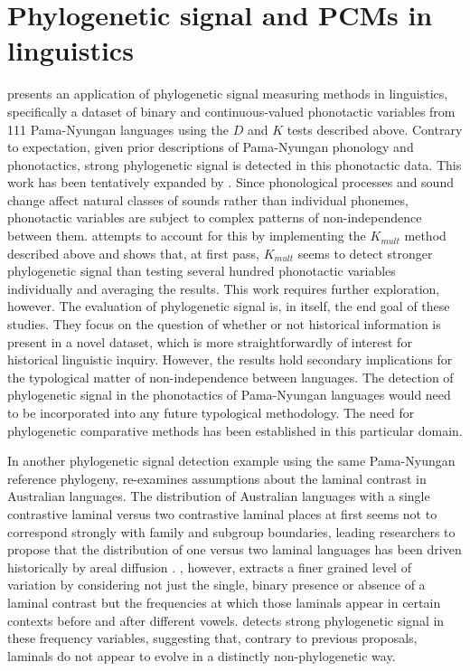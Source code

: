 \hypertarget{pcms-applications}{%
\section{Phylogenetic signal and PCMs in linguistics}\label{pcms-applications}}

\textcite{macklin-cordes_phylogenetic_2020} presents an application of phylogenetic signal measuring methods in linguistics, specifically a dataset of binary and continuous-valued phonotactic variables from 111 Pama-Nyungan languages using the \(D\) and \(K\) tests described above. Contrary to expectation, given prior descriptions of Pama-Nyungan phonology and phonotactics, strong phylogenetic signal is detected in this phonotactic data. This work has been tentatively expanded by \textcite{macklin-cordes_phylogeny_2018}. Since phonological processes and sound change affect natural classes of sounds rather than individual phonemes, phonotactic variables are subject to complex patterns of non-independence between them. \textcite{macklin-cordes_phylogeny_2018} attempts to account for this by implementing the \(K_{mult}\) method described above and shows that, at first pass, \(K_{mult}\) seems to detect stronger phylogenetic signal than testing several hundred phonotactic variables individually and averaging the results. This work requires further exploration, however. The evaluation of phylogenetic signal is, in itself, the end goal of these studies. They focus on the question of whether or not historical information is present in a novel dataset, which is more straightforwardly of interest for historical linguistic inquiry. However, the results hold secondary implications for the typological matter of non-independence between languages. The detection of phylogenetic signal in the phonotactics of Pama-Nyungan languages would need to be incorporated into any future typological methodology. The need for phylogenetic comparative methods has been established in this particular domain.

In another phylogenetic signal detection example using the same Pama-Nyungan reference phylogeny, \textcite{round_continent-wide_2017} re-examines assumptions about the laminal contrast in Australian languages. The distribution of Australian languages with a single contrastive laminal versus two contrastive laminal places at first seems not to correspond strongly with family and subgroup boundaries, leading researchers to propose that the distribution of one versus two laminal languages has been driven historically by areal diffusion \autocites{dixon_languages_1970}{dixon_languages_1980}{breen_taps_1997}{dixon_australian_2002}. \textcite{round_continent-wide_2017}, however, extracts a finer grained level of variation by considering not just the single, binary presence or absence of a laminal contrast but the frequencies at which those laminals appear in certain contexts before and after different vowels. \textcite{round_continent-wide_2017} detects strong phylogenetic signal in these frequency variables, suggesting that, contrary to previous proposals, laminals do not appear to evolve in a distinctly non-phylogenetic way.

